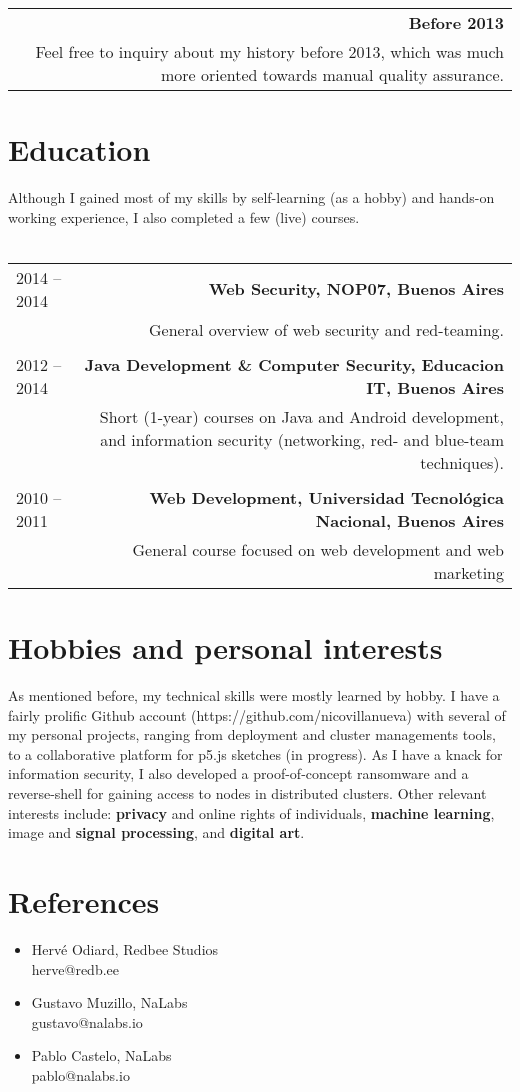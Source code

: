 \documentclass{vitae}
\begin{document}
\begin{tabular}{L!{\VRule}R}
\\
&{\bf Before 2013}\\
&Feel free to inquiry about my history before 2013, which was much more oriented towards manual quality assurance.
\end{tabular}

\section*{Education}
Although I gained most of my skills by self-learning (as a hobby) and hands-on working experience, I also completed a few (live) courses.\\
\\
\begin{tabular}{L!{\VRule}R}
2014 -- 2014&{\bf Web Security, NOP07, Buenos Aires}\\
&General overview of web security and red-teaming.\\
\\
2012 -- 2014&{\bf Java Development \& Computer Security, Educacion IT, Buenos Aires}\\
&Short (1-year) courses on Java and Android development, and information security (networking, red- and blue-team techniques).\\
\\
2010 -- 2011&{\bf Web Development, Universidad Tecnológica Nacional, Buenos Aires}\\
&General course focused on web development and web marketing\\

\end{tabular}

\section*{Hobbies and personal interests}
As mentioned before, my technical skills were mostly learned by hobby. I have a fairly prolific Github account (https://github.com/nicovillanueva) with several of my personal projects, ranging from deployment and cluster managements tools, to a collaborative platform for p5.js sketches (in progress). As I have a knack for information security, I also developed a proof-of-concept ransomware and a reverse-shell for gaining access to nodes in distributed clusters.
Other relevant interests include: {\bf privacy} and online rights of individuals, {\bf machine learning}, image and {\bf signal processing}, and {\bf digital art}.

\section*{References}
\begin{itemize}
    \item Hervé Odiard, Redbee Studios\\
    herve@redb.ee
    \item Gustavo Muzillo, NaLabs\\
    gustavo@nalabs.io
    \item Pablo Castelo, NaLabs\\
    pablo@nalabs.io
\end{itemize}
\end{document}

